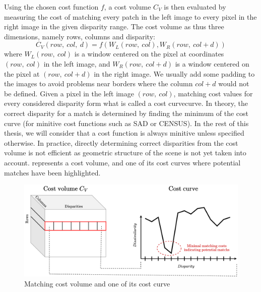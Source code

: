 Using the chosen cost function $f$, a cost volume $C_V$ is then evaluated by measuring the cost of matching every patch in the left image to every pixel in the right image in the given disparity range. The cost volume as thus three dimensions, namely rows, columns and disparity:
\begin{equation}\label{eq:cost_volume}
    C_V(row, ~col, ~d) = f(W_L(row, ~col),  W_R(row, ~col+d))
\end{equation}
where $W_L(row, ~col)$ is a window centered on the pixel at coordinates $(row, ~col)$ in the left image, and $W_R(row, ~col+d)$ is a window centered on the pixel at $(row, ~col+d)$ in the right image. We usually add some padding to the images to avoid problems near borders where the column $col+d$ would not be defined. Given a pixel in the left image $(row, ~col)$, matching cost values for every considered disparity form what is called a cost curvecurve. In theory, the correct disparity for a match is determined by finding the minimum of the cost curve (for minitive cost functions such as SAD or CENSUS). In the rest of this thesis, we will consider that a cost function is always minitive unless specified otherwise. In practice, directly determining correct disparities from the cost volume is not efficient as geometric structure of the scene is not yet taken into account.  represents a cost volume, and one of its cost curves where potential matches have been highlighted. 

\begin{figure}
	\centering
	\includegraphics[width=\linewidth]{Images/Chap_1/Cost_volume.png}
	\caption{Matching cost volume and one of its cost curve}
	\label{fig:cost_volume}
\end{figure}

